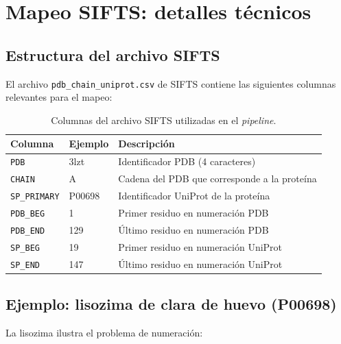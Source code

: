 \section{Mapeo SIFTS: detalles t\'ecnicos}
\label{appendix:sifts}

\subsection{Estructura del archivo SIFTS}

El archivo \texttt{pdb\_chain\_uniprot.csv} de SIFTS contiene las siguientes columnas
relevantes para el mapeo:

\begin{table}[H]
\centering
\caption{Columnas del archivo SIFTS utilizadas en el \textit{pipeline}.}
\label{tab:sifts_columns}
\begin{tabular}{@{}llp{7cm}@{}}
\toprule
\textbf{Columna} & \textbf{Ejemplo} & \textbf{Descripci\'on} \\
\midrule
\texttt{PDB} & 3lzt & Identificador PDB (4 caracteres) \\
\texttt{CHAIN} & A & Cadena del PDB que corresponde a la prote\'ina \\
\texttt{SP\_PRIMARY} & P00698 & Identificador UniProt de la prote\'ina \\
\texttt{PDB\_BEG} & 1 & Primer residuo en numeraci\'on PDB \\
\texttt{PDB\_END} & 129 & \'Ultimo residuo en numeraci\'on PDB \\
\texttt{SP\_BEG} & 19 & Primer residuo en numeraci\'on UniProt \\
\texttt{SP\_END} & 147 & \'Ultimo residuo en numeraci\'on UniProt \\
\bottomrule
\end{tabular}
\end{table}

\subsection{Ejemplo: lisozima de clara de huevo (P00698)}

La lisozima ilustra el problema de numeraci\'on:

